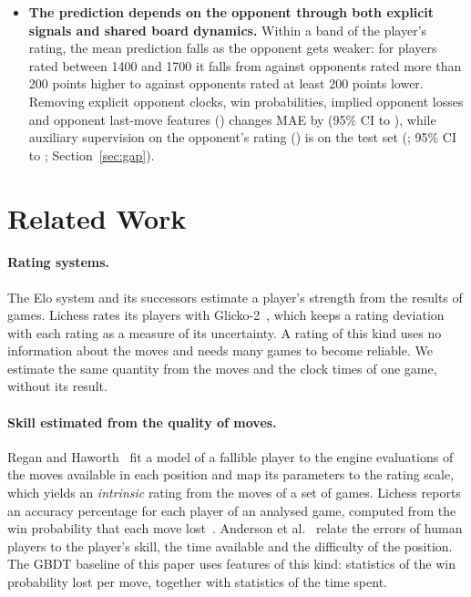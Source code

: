 \documentclass[11pt]{article}
\begin{document}
\begin{itemize}
minus the mean rating is  points for
players rated below 1100 and  points for
players rated 2000 and above. This compression follows from the size of the
prediction error and cannot be removed by recalibration
(Section~\ref{sec:calibration}).
\item \textbf{The prediction depends on the opponent through both explicit
signals and shared board dynamics.} Within a band of the player's rating,
the mean prediction falls as the opponent gets weaker: for players rated
between 1400 and 1700 it falls from
 against opponents rated more than
200 points higher to  against
opponents rated at least 200 points lower. Removing explicit opponent clocks,
win probabilities, implied opponent losses and opponent last-move features
() changes MAE by
 (95\% CI
 to
), while auxiliary supervision
on the opponent's rating () is
 on the test set
(; 95\% CI
 to
; Section~\ref{sec:gap}).
\fi
\end{itemize}

\section{Related Work}
\label{sec:related}

\paragraph{Rating systems.}
The Elo system and its successors estimate a player's strength from the
results of games. Lichess rates its players with Glicko-2~\cite{glicko2},
which keeps a rating deviation with each rating as a measure of its
uncertainty. A rating of this kind uses no information about the moves and
needs many games to become reliable. We estimate the same quantity from the
moves and the clock times of one game, without its result.

\paragraph{Skill estimated from the quality of moves.}
Regan and Haworth~\cite{intrinsic} fit a model of a fallible player to the
engine evaluations of the moves available in each position and map its
parameters to the rating scale, which yields an \emph{intrinsic} rating from
the moves of a set of games. Lichess reports an accuracy percentage for each
player of an analysed game, computed from the win probability that each move
lost~\cite{lichessaccuracy}. Anderson et al.~\cite{humanerror} relate the
errors of human players to the player's skill, the time available and the
difficulty of the position. The GBDT baseline of this paper uses features of
this kind: statistics of the win probability lost per move, together with
statistics of the time spent.
\end{document}
